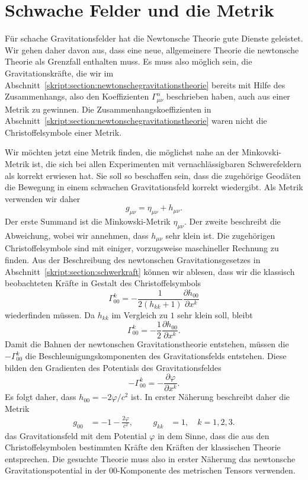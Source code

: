 \section{Schwache Felder und die Metrik}
Für schache Gravitationsfelder hat die Newtonsche Theorie gute Dienste
geleistet. 
Wir gehen daher davon aus, dass eine neue, allgemeinere Theorie die
newtonsche Theorie als Grenzfall enthalten muss.
Es muss also möglich sein, die Gravitationskräfte, die wir im 
Abschnitt~\ref{skript:section:newtonschegravitationstheorie} bereits
mit Hilfe des Zusammenhangs, also den Koeffizienten $\Gamma^\alpha_{\mu\nu}$
beschrieben haben, auch aus einer Metrik zu gewinnen.
Die Zusammenhangskoeffizienten in
Abschnitt~\ref{skript:section:newtonschegravitationstheorie} waren nicht
die Christoffelsymbole einer Metrik.

Wir möchten jetzt eine Metrik finden, die möglichst nahe an der
Minkovski-Metrik ist, die sich bei allen Experimenten mit
vernachlässigbaren Schwerefeldern als korrekt erwiesen hat.
Sie soll so beschaffen sein, dass die zugehörige Geodäten die
Bewegung in einem schwachen Gravitationsfeld korrekt wiedergibt.
Als Metrik verwenden wir daher
\[
g_{\mu\nu}=\eta_{\mu\nu} + h_{\mu\nu}.
\]
Der erste Summand ist die Minkowski-Metrik $\eta_{\mu\nu}$.
Der zweite beschreibt die Abweichung, wobei wir annehmen,
dass $h_{\mu\nu}$ sehr klein ist.
Die zugehörigen Christoffelsymbole sind mit einiger, vorzugsweise
maschineller Rechnung zu finden.
Aus der Beschreibung des newtonschen Gravitationsgesetzes
in Abschnitt~\ref{skript:section:schwerkraft} können wir
ablesen, dass wir die klassisch beobachteten Kräfte in Gestalt
des Christoffelsymbols
\[
\Gamma^{k}_{00}
=
-\frac{1}{2(h_{kk} + 1)}\frac{\partial h_{00}}{\partial x^k}
\]
wiederfinden müssen.
Da $h_{kk}$ im Vergleich zu $1$ sehr klein soll, bleibt
\[
\Gamma^{k}_{00}
=
-\frac{1}{2}\frac{\partial h_{00}}{\partial x^k}.
\]
Damit die Bahnen der newtonschen Gravitationstheorie entstehen, müssen
die $-\Gamma^k_{00}$ die Beschleunigungskomponenten des Gravitationsfelds
entstehen.
Diese bilden den Gradienten des Potentials des Gravitationsfeldes
\[
-\Gamma^k_{00} = -\frac{\partial\varphi}{\partial x^k}.
\]
Es folgt daher, dass $h_{00}=-2\varphi/c^2$ ist.
In erster Näherung beschreibt daher die Metrik
\begin{equation}
\begin{aligned}
g_{00} &= -1 -\frac{2\varphi}{c^2},
&&&
g_{kk} &= 1,\quad k=1,2,3.
\end{aligned}
\label{skript:gravitation:naeherung}
\end{equation}
das Gravitationsfeld mit dem Potential $\varphi$ in dem Sinne, dass
die aus den Christoffelsymbolen bestimmten Kräfte den Kräften der
klassischen Theorie entsprechen.
Die gesuchte Theorie muss also in erster Näherung das newtonsche
Gravitationspotential in der $00$-Komponente des metrischen Tensors
verwenden.

